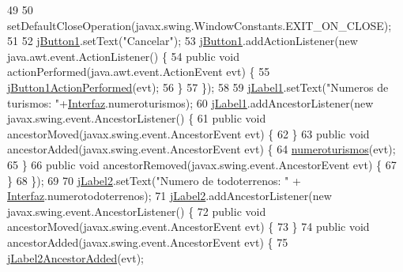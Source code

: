 \begin{DoxyCode}
49 
50         setDefaultCloseOperation(javax.swing.WindowConstants.EXIT\_ON\_CLOSE);
51 
52         \mbox{\hyperlink{classejercicio2_1_1_interfaz_estadisticas_a2e04a5a0eb4f298d827c33c859436a97}{jButton1}}.setText(\textcolor{stringliteral}{"Cancelar"});
53         \mbox{\hyperlink{classejercicio2_1_1_interfaz_estadisticas_a2e04a5a0eb4f298d827c33c859436a97}{jButton1}}.addActionListener(\textcolor{keyword}{new} java.awt.event.ActionListener() \{
54             \textcolor{keyword}{public} \textcolor{keywordtype}{void} actionPerformed(java.awt.event.ActionEvent evt) \{
55                 \mbox{\hyperlink{classejercicio2_1_1_interfaz_estadisticas_aa3d00a7600a56a65dcde3ab694c902db}{jButton1ActionPerformed}}(evt);
56             \}
57         \});
58 
59         \mbox{\hyperlink{classejercicio2_1_1_interfaz_estadisticas_a5e051aa4c804a5eb48e3f047abce704c}{jLabel1}}.setText(\textcolor{stringliteral}{"Numeros de turismos: "}+\mbox{\hyperlink{namespace_interfaz}{Interfaz}}.numeroturismos);
60         \mbox{\hyperlink{classejercicio2_1_1_interfaz_estadisticas_a5e051aa4c804a5eb48e3f047abce704c}{jLabel1}}.addAncestorListener(\textcolor{keyword}{new} javax.swing.event.AncestorListener() \{
61             \textcolor{keyword}{public} \textcolor{keywordtype}{void} ancestorMoved(javax.swing.event.AncestorEvent evt) \{
62             \}
63             \textcolor{keyword}{public} \textcolor{keywordtype}{void} ancestorAdded(javax.swing.event.AncestorEvent evt) \{
64                 \mbox{\hyperlink{classejercicio2_1_1_interfaz_estadisticas_a7cea5027e3bb66ab639fb412c07dd74d}{numeroturismos}}(evt);
65             \}
66             \textcolor{keyword}{public} \textcolor{keywordtype}{void} ancestorRemoved(javax.swing.event.AncestorEvent evt) \{
67             \}
68         \});
69 
70         \mbox{\hyperlink{classejercicio2_1_1_interfaz_estadisticas_a227479001256e104ad41996508f6125e}{jLabel2}}.setText(\textcolor{stringliteral}{"Numero de todoterrenos: "} + \mbox{\hyperlink{namespace_interfaz}{Interfaz}}.numerotodoterrenos);
71         \mbox{\hyperlink{classejercicio2_1_1_interfaz_estadisticas_a227479001256e104ad41996508f6125e}{jLabel2}}.addAncestorListener(\textcolor{keyword}{new} javax.swing.event.AncestorListener() \{
72             \textcolor{keyword}{public} \textcolor{keywordtype}{void} ancestorMoved(javax.swing.event.AncestorEvent evt) \{
73             \}
74             \textcolor{keyword}{public} \textcolor{keywordtype}{void} ancestorAdded(javax.swing.event.AncestorEvent evt) \{
75                 \mbox{\hyperlink{classejercicio2_1_1_interfaz_estadisticas_a1a93ffcd06a1b4c1e6fd686adff3d694}{jLabel2AncestorAdded}}(evt);

\end{DoxyCode}
